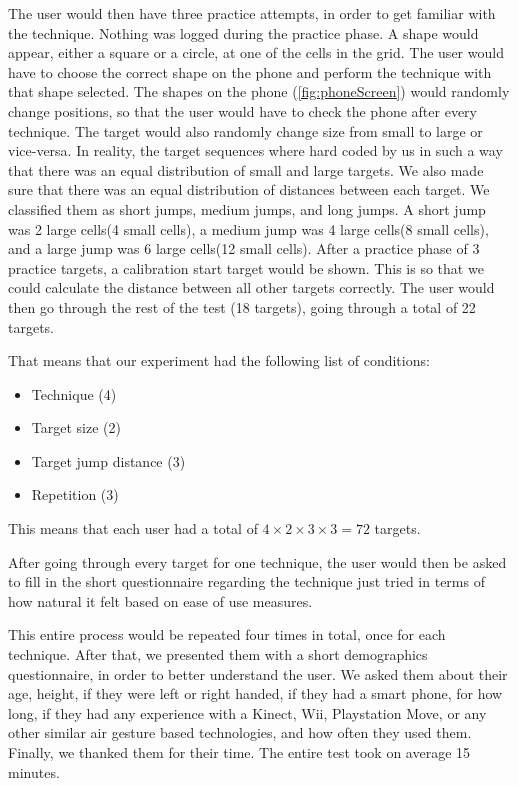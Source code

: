 The user would then have three practice attempts, in order to get familiar with the technique. 
Nothing was logged during the practice phase.
A shape would appear, either a square or a circle, at one of the cells in the grid. 
The user would have to choose the correct shape on the phone and perform the technique with that shape selected. 
The shapes on the phone (\cref{fig:phoneScreen}) would randomly change positions, so that the user would have to check the phone after every technique. 
The target would also randomly change size from small to large or vice-versa. 
In reality, the target sequences where hard coded by us in such a way that there was an equal distribution of small and large targets. 
We also made sure that there was an equal distribution of distances between each target. We classified them as short jumps, medium jumps, and long jumps. 
A short jump was 2 large cells(4 small cells), a medium jump was 4 large cells(8 small cells), and a large jump was 6 large cells(12 small cells).  
After a practice phase of 3 practice targets, a calibration start target would be shown. This is so that we could calculate the distance between all other targets correctly. 
The user would then go through the rest of the test (18 targets), going through a total of 22 targets. 

That means that our experiment had the following list of conditions:
\begin{itemize}
	 \item Technique (4)
	 \item Target size (2)
	 \item Target jump distance (3)
	 \item Repetition (3)
\end{itemize}

This means that each user had a total of $4 \times 2 \times 3 \times 3 = 72 $ targets.

After going through every target for one technique, the user would then be asked to fill in the short questionnaire regarding the technique just tried in terms of how natural it felt based on ease of use measures. 

This entire process would be repeated four times in total, once for each technique. 
After that, we presented them with a short demographics questionnaire, in order to better understand the user. 
We asked them about their age, height, if they were left or right handed, if they had a smart phone, for how long, if they had any experience with a Kinect, Wii, Playstation Move, or any other similar air gesture based technologies, and how often they used them. 
Finally, we thanked them for their time.
The entire test took on average 15 minutes. 